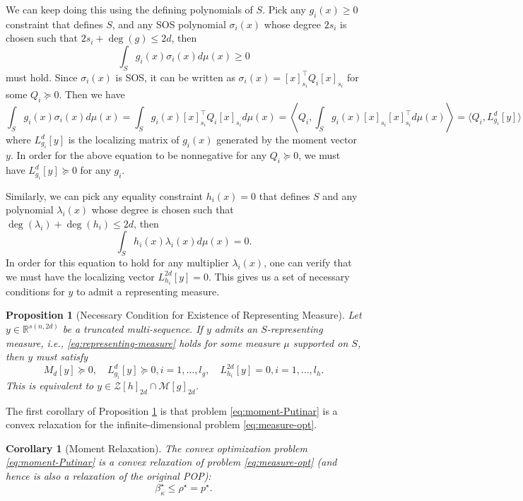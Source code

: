\documentclass[
]{book}
\newtheorem{corollary}{Corollary}[chapter]
\newtheorem{proposition}{Proposition}[chapter]
\theoremstyle{definition}
\theoremstyle{definition}
\theoremstyle{definition}
\theoremstyle{definition}
\theoremstyle{remark}
\begin{document}
We can keep doing this using the defining polynomials of \(S\). Pick any \(g_i(x) \geq 0\) constraint that defines \(S\), and any SOS polynomial \(\sigma_i(x)\) whose degree \(2s_i\) is chosen such that \(2 s_i + \deg(g) \leq 2d\), then
\[
\int_S g_i(x) \sigma_i(x) d\mu(x) \geq 0
\]
must hold. Since \(\sigma_i(x)\) is SOS, it can be written as \(\sigma_i(x) = [x]_{s_i}^\top Q_i [x]_{s_i}\) for some \(Q_i \succeq 0\). Then we have
\[
\int_S g_i(x) \sigma_i(x) d\mu(x) = \int_S g_i(x) [x]_{s_i}^\top Q_i [x]_{s_i} d\mu(x) = \left\langle Q_i,  \int_S g_i(x) [x]_{s_i}[x]_{s_i}^\top d\mu(x)  \right\rangle = \langle Q_i,  L_{g_i}^d[y] \rangle
\]
where \(L_{g_i}^d [y]\) is the localizing matrix of \(g_i(x)\) generated by the moment vector \(y\). In order for the above equation to be nonnegative for any \(Q_i \succeq 0\), we must have \(L_{g_i}^d[y] \succeq 0\) for any \(g_i\).

Similarly, we can pick any equality constraint \(h_i(x) = 0\) that defines \(S\) and any polynomial \(\lambda_i(x)\) whose degree is chosen such that \(\deg(\lambda_i) + \deg(h_i) \leq 2d\), then
\[
\int_S h_i(x) \lambda_i(x) d\mu(x) = 0.
\]
In order for this equation to hold for any multiplier \(\lambda_i(x)\), one can verify that we must have the localizing vector \(L_{h_i}^{2d}[y] = 0\). This gives us a set of necessary conditions for \(y\) to admit a representing measure.

\begin{proposition}[Necessary Condition for Existence of Representing Measure]
\protect\hypertarget{prp:NecessaryConditionRepresentingMeasure}{}\label{prp:NecessaryConditionRepresentingMeasure}Let \(y \in \mathbb{R}^{s(n,2d)}\) be a truncated multi-sequence. If \(y\) admits an \(S\)-representing measure, i.e., \eqref{eq:representing-measure} holds for some measure \(\mu\) supported on \(S\), then \(y\) must satisfy
\[
M_d[y] \succeq 0, \quad L_{g_i}^d[y] \succeq 0, i=1,\dots,l_g, \quad L_{h_i}^{2d}[y] = 0, i=1,\dots,l_h.
\]
This is equivalent to \(y \in \mathcal{Z}[h]_{2d} \cap \mathcal{M}[g]_{2d}\).
\end{proposition}

The first corollary of Proposition \ref{prp:NecessaryConditionRepresentingMeasure} is that problem \eqref{eq:moment-Putinar} is a convex relaxation for the infinite-dimensional problem \eqref{eq:measure-opt}.

\begin{corollary}[Moment Relaxation]
\protect\hypertarget{cor:MomentRelaxation}{}\label{cor:MomentRelaxation}The convex optimization problem \eqref{eq:moment-Putinar} is a convex relaxation of problem \eqref{eq:measure-opt} (and hence is also a relaxation of the original POP):
\[
\beta^\star_\kappa \leq \rho^\star = p^\star.
\]
\end{corollary}
\end{document}
